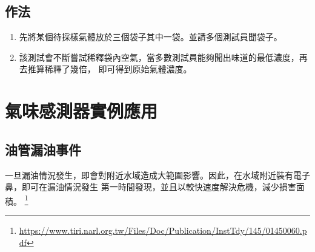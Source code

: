 \subsection{作法}
\begin{enumerate}
	\item 先將某個待採樣氣體放於三個袋子其中一袋。並請多個測試員聞袋子。
	\item 該測試會不斷嘗試稀釋袋內空氣，當多數測試員能夠聞出味道的最低濃度，再去推算稀釋了幾倍，
		即可得到原始氣體濃度。
\end{enumerate}

\section{氣味感測器實例應用}
	\subsection{油管漏油事件}
	一旦漏油情況發生，即會對附近水域造成大範圍影響。因此，在水域附近裝有電子鼻，即可在漏油情況發生
	第一時間發現，並且以較快速度解決危機，減少損害面積。 \footnote{\url{https://www.tiri.narl.org.tw/Files/Doc/Publication/InstTdy/145/01450060.pdf}}